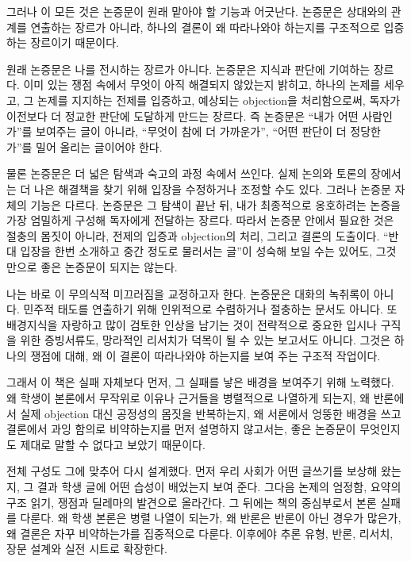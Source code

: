 그러나 이 모든 것은 논증문이 원래 맡아야 할 기능과 어긋난다. 논증문은 상대와의 관계를 연출하는 장르가 아니라, 하나의 결론이 왜 따라나와야 하는지를 구조적으로 입증하는 장르이기 때문이다.

원래 논증문은 나를 전시하는 장르가 아니다. 논증문은 지식과 판단에 기여하는 장르다. 이미 있는 쟁점 속에서 무엇이 아직 해결되지 않았는지 밝히고, 하나의 논제를 세우고, 그 논제를 지지하는 전제를 입증하고, 예상되는 objection을 처리함으로써, 독자가 이전보다 더 정교한 판단에 도달하게 만드는 장르다. 즉 논증문은 ``내가 어떤 사람인가''를 보여주는 글이 아니라, ``무엇이 참에 더 가까운가'', ``어떤 판단이 더 정당한가''를 밀어 올리는 글이어야 한다.

물론 논증문은 더 넓은 탐색과 숙고의 과정 속에서 쓰인다. 실제 논의와 토론의 장에서는 더 나은 해결책을 찾기 위해 입장을 수정하거나 조정할 수도 있다. 그러나 논증문 자체의 기능은 다르다. 논증문은 그 탐색이 끝난 뒤, 내가 최종적으로 옹호하려는 논증을 가장 엄밀하게 구성해 독자에게 전달하는 장르다. 따라서 논증문 안에서 필요한 것은 절충의 몸짓이 아니라, 전제의 입증과 objection의 처리, 그리고 결론의 도출이다. ``반대 입장을 한번 소개하고 중간 정도로 물러서는 글''이 성숙해 보일 수는 있어도, 그것만으로 좋은 논증문이 되지는 않는다.

나는 바로 이 무의식적 미끄러짐을 교정하고자 한다. 논증문은 대화의 녹취록이 아니다. 민주적 태도를 연출하기 위해 인위적으로 수렴하거나 절충하는 문서도 아니다. 또 배경지식을 자랑하고 많이 검토한 인상을 남기는 것이 전략적으로 중요한 입시나 구직을 위한 증빙서류도, 망라적인 리서치가 덕목이 될 수 있는 보고서도 아니다. 그것은 하나의 쟁점에 대해, 왜 이 결론이 따라나와야 하는지를 보여 주는 구조적 작업이다.

그래서 이 책은 실패 자체보다 먼저, 그 실패를 낳은 배경을 보여주기 위해 노력했다. 왜 학생이 본론에서 무작위로 이유나 근거들을 병렬적으로 나열하게 되는지, 왜 반론에서 실제 objection 대신 공정성의 몸짓을 반복하는지, 왜 서론에서 엉뚱한 배경을 쓰고 결론에서 과잉 함의로 비약하는지를 먼저 설명하지 않고서는, 좋은 논증문이 무엇인지도 제대로 말할 수 없다고 보았기 때문이다.

전체 구성도 그에 맞추어 다시 설계했다. 먼저 우리 사회가 어떤 글쓰기를 보상해 왔는지, 그 결과 학생 글에 어떤 습성이 배었는지 보여 준다. 그다음 논제의 엄정함, 요약의 구조 읽기, 쟁점과 딜레마의 발견으로 올라간다. 그 뒤에는 책의 중심부로서 본론 실패를 다룬다. 왜 학생 본론은 병렬 나열이 되는가, 왜 반론은 반론이 아닌 경우가 많은가, 왜 결론은 자꾸 비약하는가를 집중적으로 다룬다. 이후에야 추론 유형, 반론, 리서치, 장문 설계와 실전 시트로 확장한다.

